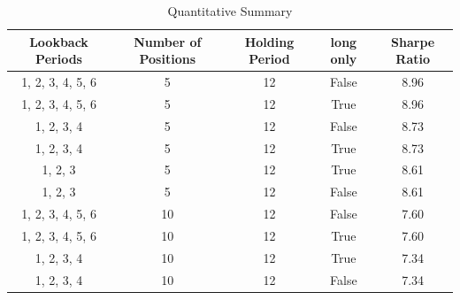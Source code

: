 \documentclass[11pt,a4paper,english,oneside]{book}
\begin{document}
\begin{table}[ht]
\centering
\caption{Quantitative Summary}
\begin{tabular}{|c|c|c|c|c|} %
\hline %
\textbf{Lookback Periods} & \textbf{Number of Positions} & \textbf{Holding Period} & \textbf{long only} & \textbf{Sharpe Ratio} \\ %
\hline
1, 2, 3, 4, 5, 6 & 5 & 12 & False & 8.96 \\
1, 2, 3, 4, 5, 6 & 5 & 12 & True & 8.96\\
1, 2, 3, 4 & 5 & 12 & False & 8.73\\
1, 2, 3, 4 & 5 & 12 & True & 8.73\\
1, 2, 3 & 5 & 12 & True & 8.61\\
1, 2, 3 & 5 & 12 & False & 8.61\\
1, 2, 3, 4, 5, 6 & 10 & 12 & False & 7.60\\
1, 2, 3, 4, 5, 6 & 10 & 12 & True & 7.60\\
1, 2, 3, 4 & 10 & 12 & True & 7.34\\
1, 2, 3, 4 & 10 & 12 & False & 7.34\\
\hline
\end{tabular}
\end{table}

\printbibliography
\end{document}
